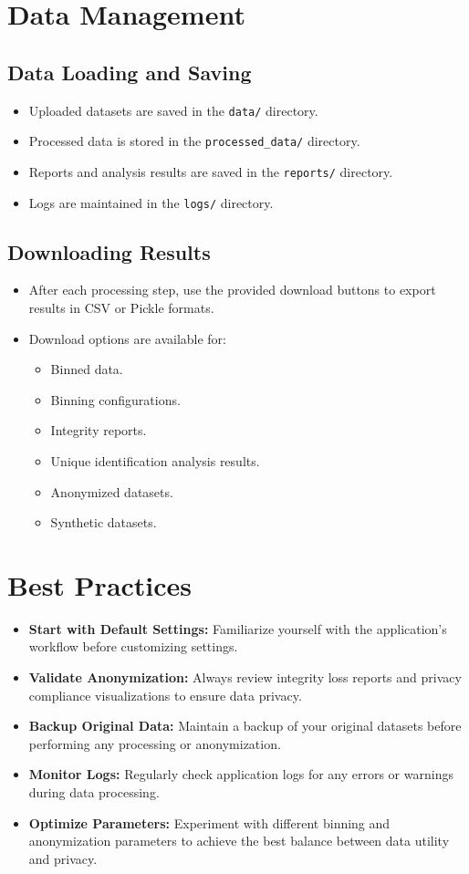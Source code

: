 \documentclass[12pt,a4paper]{article}
\begin{document}
\section{Data Management}
\subsection{Data Loading and Saving}
\begin{itemize}
    \item Uploaded datasets are saved in the \texttt{data/} directory.
    \item Processed data is stored in the \texttt{processed\_data/} directory.
    \item Reports and analysis results are saved in the \texttt{reports/} directory.
    \item Logs are maintained in the \texttt{logs/} directory.
\end{itemize}

\subsection{Downloading Results}
\begin{itemize}
    \item After each processing step, use the provided download buttons to export results in CSV or Pickle formats.
    \item Download options are available for:
    \begin{itemize}
        \item Binned data.
        \item Binning configurations.
        \item Integrity reports.
        \item Unique identification analysis results.
        \item Anonymized datasets.
        \item Synthetic datasets.
    \end{itemize}
\end{itemize}

\section{Best Practices}
\begin{itemize}
    \item \textbf{Start with Default Settings:} Familiarize yourself with the application's workflow before customizing settings.
    \item \textbf{Validate Anonymization:} Always review integrity loss reports and privacy compliance visualizations to ensure data privacy.
    \item \textbf{Backup Original Data:} Maintain a backup of your original datasets before performing any processing or anonymization.
    \item \textbf{Monitor Logs:} Regularly check application logs for any errors or warnings during data processing.
    \item \textbf{Optimize Parameters:} Experiment with different binning and anonymization parameters to achieve the best balance between data utility and privacy.
\end{itemize}
\end{document}
